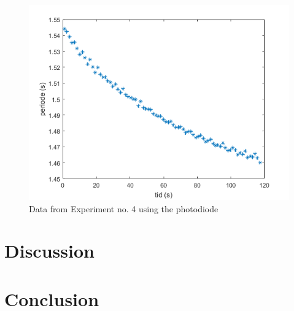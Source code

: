 \documentclass[%
 reprint,
 amsmath,amssymb,
 aps,
]{revtex4-1}
\begin{document}
    \begin{figure}[h!]
    	\center
    	\includegraphics[scale=0.6]{forsok4fig1}
    	\caption{Data from Experiment no. 4 using the photodiode}
    \end{figure}


  	

\section{Discussion}
 
\section{Conclusion}
	


\end{document}
